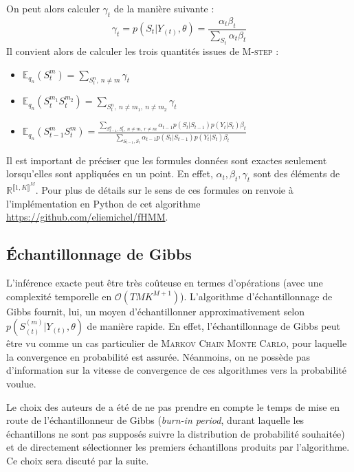 \documentclass[10pt,a4paper]{article}
\newcommand{\mcmclong}{\textsc{Markov Chain Monte Carlo}}
\newcommand{\Mstep}{\textsc{M-step}}
\begin{document}
On peut alors calculer $\gamma_t$ de la manière suivante :
\begin{equation}
\gamma_t=p(S_t \vert Y_{(t)}, \theta)= \frac{\alpha_t 
\beta_t}{\underset{S_t}{\sum} \alpha_t \beta_t}
\end{equation}
Il convient alors de calculer les trois quantités issues de \Mstep{} :
\begin{itemize}
\item $\mathbb{E}_{q_n}(S_t^m)= \underset{S_t^n, \ n \neq m}{\sum} \gamma_t$
\item $\mathbb{E}_{q_n}(S_t^{m_1}S_t^{m_2})= \underset{S_t^n, \ n \neq m_1, \ n 
\neq m_2}{\sum} \gamma_t$
\item $\mathbb{E}_{q_n}(S_{t-1}^mS_t^m)= \frac{\underset{S_{t-1}^n,S_t^r, \ n 
\neq m, \ r \neq m}{\sum}\alpha_{t-1} p(S_t \vert S_{t-1}) p(Y_t \vert S_t) 
\beta_t}{\underset{S_{t-1}, S_t}{\sum}\alpha_{t-1}p(S_t \vert S_{t-1})p(Y_t 
\vert S_t) \beta_t} $
\end{itemize}
Il est important de préciser que les formules données sont exactes seulement 
lorsqu'elles sont appliquées en un point. En effet, $\alpha_t, \beta_t, 
\gamma_t$ sont des éléments de $\mathbb{R}^{\llbracket 1,K \rrbracket^M}$. Pour 
plus de détails sur le sens de ces formules on renvoie à l'implémentation en 
Python de cet algorithme \url{https://github.com/eliemichel/fHMM}.

\subsection{Échantillonnage de Gibbs}

L'inférence exacte peut être très co\^{u}teuse en termes d'opérations (avec une
complexité temporelle en $\mathcal{O}(TMK^{M+1})$).
L'algorithme d'échantillonnage de Gibbs fournit, lui, un moyen d'échantillonner
approximativement selon $p(S_{(t)}^{(m)} \vert  Y_{(t)}, \theta)$ de
manière rapide.
En effet, l'échantillonnage de Gibbs peut être vu comme un cas particulier de
\mcmclong{}, pour laquelle la convergence en probabilité est
assurée.
Néanmoins, on ne possède pas d'information sur la vitesse de convergence de ces
algorithmes vers la probabilité voulue.

  Le choix des auteurs de \cite{ghahramani1997factorial} a été de ne pas prendre
en compte le temps de mise en route de l'échantillonneur de Gibbs
(\og{}\emph{burn-in period}\fg{}, durant laquelle les échantillons ne sont pas supposés
suivre la distribution de probabilité souhaitée) et de directement sélectionner
les premiers échantillons produits par l'algorithme.
Ce choix sera discuté par la suite.
\end{document}
